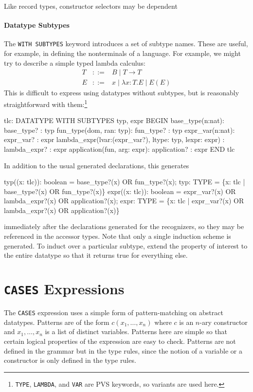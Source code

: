 Like record types, constructor selectors may be dependent

\paragraph{Datatype Subtypes}

The \texttt{WITH SUBTYPES} keyword introduces a set of subtype names.
These are useful, for example, in defining the nonterminals of a language.
For example, we might try to describe a simple typed lambda calculus:
\begin{eqnarray*}
T & ::= & B \;|\; T \rightarrow T \\
E & ::= & x \;|\; \lambda x:T.E \;|\; E(E)
\end{eqnarray*}
This is difficult to express using datatypes without subtypes, but is
reasonably straightforward with them:\footnote{\texttt{TYPE},
\texttt{LAMBDA}, and \texttt{VAR} are PVS keywords, so variants are used
here.}
\begin{pvsex}
tlc: DATATYPE WITH SUBTYPES typ, expr
 BEGIN
 base_type(n:nat): base_type? : typ
 fun_type(dom, ran: typ): fun_type? : typ
 expr_var(n:nat): expr_var? : expr
 lambda_expr(lvar:(expr_var?), ltype: typ, lexpr: expr)
                            : lambda_expr? : expr
 application(fun, arg: expr): application? : expr
 END tlc
\end{pvsex}
In addition to the usual generated declarations, this generates
\begin{pvsex}
  typ((x: tlc)): boolean = base_type?(x) OR fun_type?(x);
  typ: TYPE = \{x: tlc | base_type?(x) OR fun_type?(x)\}
  expr((x: tlc)): boolean =
     expr_var?(x) OR lambda_expr?(x) OR application?(x);
  expr: TYPE =
     \{x: tlc | expr_var?(x) OR lambda_expr?(x) OR application?(x)\}
\end{pvsex}
immediately after the declarations generated for the recognizers, so they
may be referenced in the accessor types.  Note that only a single
induction scheme is generated.  To induct over a particular subtype,
extend the property of interest to the entire datatype so that it returns
true for everything else.


\section{\texttt{CASES} Expressions}

The \texttt{CASES} expression uses a simple form of pattern-matching on
abstract datatypes.  Patterns are of the form $c(x_1,\ldots, x_n)$ where
$c$ is an $n$-ary constructor and $x_1,\ldots, x_n$ is a list of distinct
variables.  Patterns here are simple so that certain logical properties of
the expression are easy to check.  Patterns are not defined in the grammar
but in the type rules, since the notion of a variable or a constructor is
only defined in the type rules.

